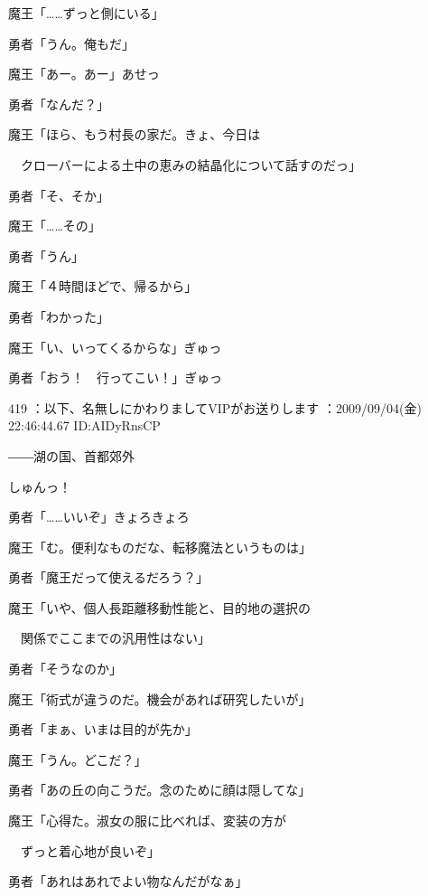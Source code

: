 \documentclass[a4j,twocolumn]{tarticle}
\begin{document}
魔王「……ずっと側にいる」\par{} 
勇者「うん。俺もだ」 



魔王「あー。あー」あせっ\par{} 
勇者「なんだ？」 



魔王「ほら、もう村長の家だ。きょ、今日は\par{} 
　クローバーによる土中の恵みの結晶化について話すのだっ」\par{} 
勇者「そ、そか」 



魔王「……その」\par{} 
勇者「うん」 



魔王「４時間ほどで、帰るから」\par{} 
勇者「わかった」 



魔王「い、いってくるからな」ぎゅっ\par{} 
勇者「おう！　行ってこい！」ぎゅっ 

	
    
    
    
419 ：以下、名無しにかわりましてVIPがお送りします ：2009/09/04(金) 22:46:44.67 ID:AIDyRnsCP 


――湖の国、首都郊外 



しゅんっ！ 



勇者「……いいぞ」きょろきょろ 



魔王「む。便利なものだな、転移魔法というものは」\par{} 
勇者「魔王だって使えるだろう？」 



魔王「いや、個人長距離移動性能と、目的地の選択の\par{} 
　関係でここまでの汎用性はない」\par{} 
勇者「そうなのか」 



魔王「術式が違うのだ。機会があれば研究したいが」\par{} 
勇者「まぁ、いまは目的が先か」 



魔王「うん。どこだ？」\par{} 
勇者「あの丘の向こうだ。念のために顔は隠してな」 



魔王「心得た。淑女の服に比べれば、変装の方が\par{} 
　ずっと着心地が良いぞ」 \par{}
勇者「あれはあれでよい物なんだがなぁ」 
\end{document}
